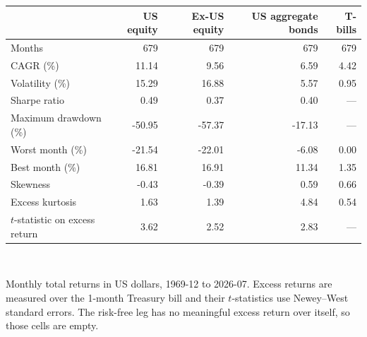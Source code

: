 \small
\begin{tabular}{lrrrr}
\toprule
  & \textbf{US equity} & \textbf{Ex-US equity} & \textbf{US aggregate bonds} & \textbf{T-bills} \\
\midrule
Months & 679 & 679 & 679 & 679 \\
CAGR (\%) & 11.14 & 9.56 & 6.59 & 4.42 \\
Volatility (\%) & 15.29 & 16.88 & 5.57 & 0.95 \\
Sharpe ratio & 0.49 & 0.37 & 0.40 & --- \\
Maximum drawdown (\%) & -50.95 & -57.37 & -17.13 & --- \\
Worst month (\%) & -21.54 & -22.01 & -6.08 & 0.00 \\
Best month (\%) & 16.81 & 16.91 & 11.34 & 1.35 \\
Skewness & -0.43 & -0.39 & 0.59 & 0.66 \\
Excess kurtosis & 1.63 & 1.39 & 4.84 & 0.54 \\
$t$-statistic on excess return & 3.62 & 2.52 & 2.83 & --- \\
\bottomrule
\end{tabular}
\\[0.4em]
\begin{minipage}{\linewidth}\footnotesize Monthly total returns in US dollars, 1969-12 to 2026-07. Excess returns are measured over the 1-month Treasury bill and their $t$-statistics use Newey--West standard errors. The risk-free leg has no meaningful excess return over itself, so those cells are empty.\end{minipage}
